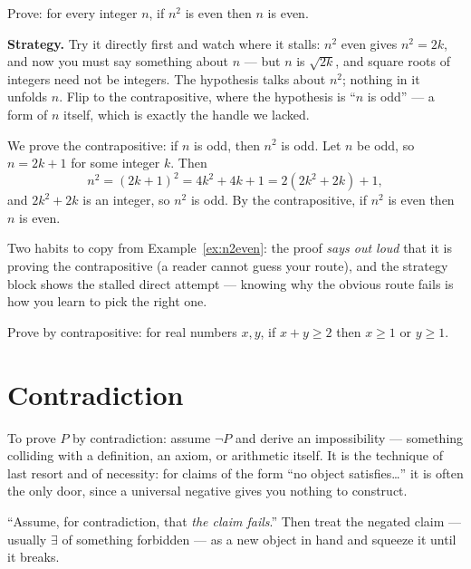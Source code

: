 \begin{example}\label{ex:n2even}
Prove: for every integer $n$, if $n^2$ is even then $n$ is even.
\par\smallskip
\textbf{Strategy.} Try it directly first and watch where it stalls: $n^2$ even
gives $n^2 = 2k$, and now you must say something about $n$ --- but $n$ is
$\sqrt{2k}$, and square roots of integers need not be integers. The hypothesis
talks about $n^2$; nothing in it unfolds $n$. Flip to the contrapositive, where
the hypothesis is ``$n$ is odd'' --- a form of $n$ itself, which is exactly the
handle we lacked.
\par\smallskip
\begin{solution}
We prove the contrapositive: if $n$ is odd, then $n^2$ is odd. Let $n$ be odd,
so $n = 2k + 1$ for some integer $k$. Then
\[
n^2 = (2k+1)^2 = 4k^2 + 4k + 1 = 2(2k^2 + 2k) + 1,
\]
and $2k^2 + 2k$ is an integer, so $n^2$ is odd. By the contrapositive, if $n^2$
is even then $n$ is even.
\end{solution}
\end{example}

Two habits to copy from Example~\ref{ex:n2even}: the proof \emph{says out loud}
that it is proving the contrapositive (a reader cannot guess your route), and
the strategy block shows the stalled direct attempt --- knowing why the obvious
route fails is how you learn to pick the right one.

\begin{exercise}[easy]\label{exr:sumge2}
Prove by contrapositive: for real numbers $x, y$, if $x + y \ge 2$ then
$x \ge 1$ or $y \ge 1$.
\end{exercise}

\section{Contradiction}\label{sec:contradiction}

To prove $P$ by contradiction: assume $\lnot P$ and derive an impossibility ---
something colliding with a definition, an axiom, or arithmetic itself. It is the
technique of last resort and of necessity: for claims of the form ``no object
satisfies\dots'' it is often the only door, since a universal negative gives you
nothing to construct.

\begin{principle}
``Assume, for contradiction, that \emph{the claim fails}.'' Then treat the
negated claim --- usually $\exists$ of something forbidden --- as a new object
in hand and squeeze it until it breaks.
\end{principle}

